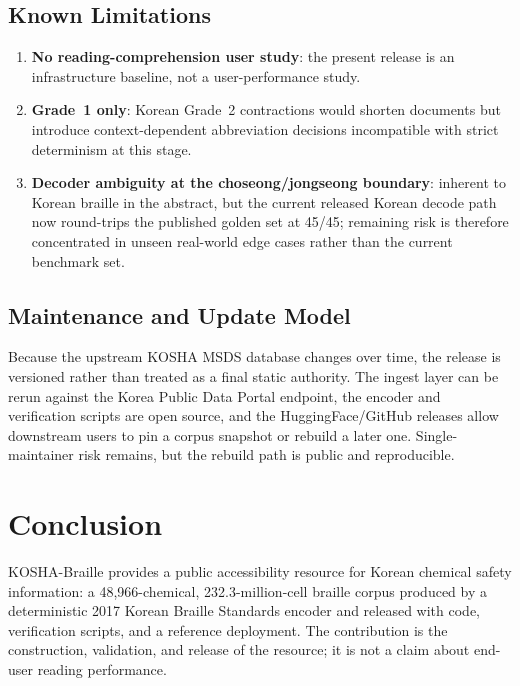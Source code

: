 \documentclass[smallextended]{svjour3}
\begin{document}
\subsection{Known Limitations}

\begin{enumerate}
\item \textbf{No reading-comprehension user study}: the present release is an infrastructure baseline, not a user-performance study.
\item \textbf{Grade~1 only}: Korean Grade~2 contractions would shorten documents but introduce context-dependent abbreviation decisions incompatible with strict determinism at this stage.
\item \textbf{Decoder ambiguity at the choseong/jongseong boundary}: inherent to Korean braille in the abstract, but the current released Korean decode path now round-trips the published golden set at 45/45; remaining risk is therefore concentrated in unseen real-world edge cases rather than the current benchmark set.
\end{enumerate}

\subsection{Maintenance and Update Model}
\label{sec:maintenance}

Because the upstream KOSHA MSDS database changes over time, the release is versioned rather than treated as a final static authority. The ingest layer can be rerun against the Korea Public Data Portal endpoint, the encoder and verification scripts are open source, and the HuggingFace/GitHub releases allow downstream users to pin a corpus snapshot or rebuild a later one. Single-maintainer risk remains, but the rebuild path is public and reproducible.

\section{Conclusion}
\label{sec:conclusion}

KOSHA-Braille provides a public accessibility resource for Korean chemical safety information: a 48{,}966-chemical, 232.3-million-cell braille corpus produced by a deterministic 2017 Korean Braille Standards encoder and released with code, verification scripts, and a reference deployment. The contribution is the construction, validation, and release of the resource; it is not a claim about end-user reading performance.
\end{document}
